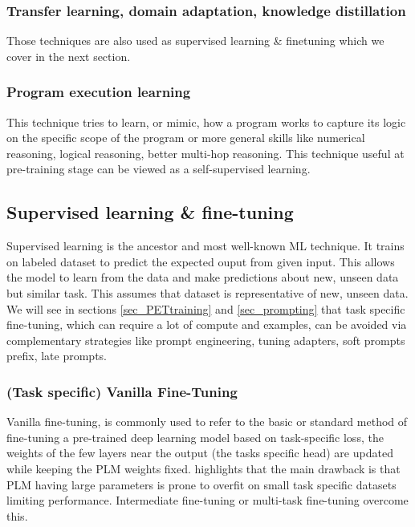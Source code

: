 \documentclass[acmsmall]{acmart}
\begin{document}
\subsubsection{Transfer learning, domain adaptation, knowledge distillation}\label{sec_pretraining_transfert}
Those techniques are also used as supervised learning \& finetuning which we cover in the next section.

\subsubsection{Program execution learning}\label{sec_pretraining_program}
This technique\citep{piReasoningProgramExecutors2022} tries to learn, or mimic, how a program works to capture its logic on the specific scope of the program or more general skills like numerical reasoning, logical reasoning, better multi-hop reasoning. This technique useful at pre-training stage can be viewed as a self-supervised learning.

\subsection{Supervised learning \& fine-tuning}\label{sec_supervisedtraining}
Supervised learning is the ancestor and most well-known ML technique. It trains on labeled dataset to predict the expected ouput from given input. This allows the model to learn from the data and make predictions about new, unseen data but similar task. This assumes that dataset is representative of new, unseen data. We will see in sections \ref{sec_PETtraining} and \ref{sec_prompting} that task specific fine-tuning, which can require a lot of compute and examples, can be avoided via complementary strategies like prompt engineering, tuning adapters, soft prompts prefix, late prompts.

\subsubsection{(Task specific) Vanilla Fine-Tuning}
Vanilla fine-tuning, is commonly used to refer to the basic or standard method of fine-tuning a pre-trained deep learning model based on task-specific loss, the weights of the few layers near the output (the tasks specific head) are updated while keeping the PLM weights fixed. \citet{kalyanAMMUSSurveyTransformerbased2021} highlights that the main drawback is that PLM having large parameters is prone to overfit on small task specific datasets limiting performance. Intermediate fine-tuning or multi-task fine-tuning overcome this.
\end{document}
